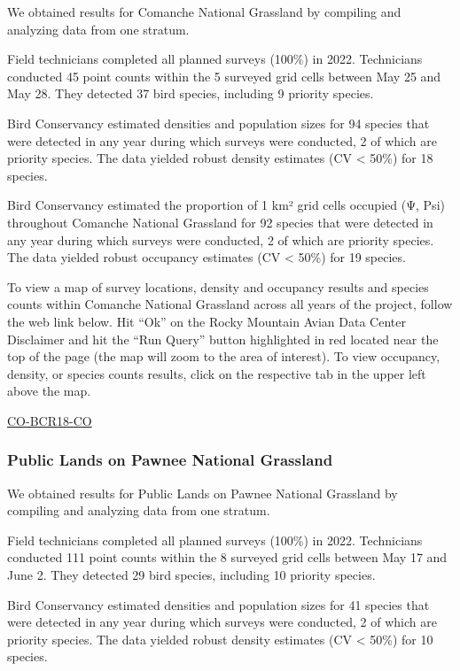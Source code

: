 \documentclass[
  letterpaper,
  DIV=11,
  numbers=noendperiod,
  oneside]{scrreprt}
\begin{document}
We obtained results for Comanche National Grassland by compiling and
analyzing data from one stratum.

Field technicians completed all planned surveys (100\%) in 2022.
Technicians conducted 45 point counts within the 5 surveyed grid cells
between May 25 and May 28. They detected 37 bird species, including 9
priority species.

Bird Conservancy estimated densities and population sizes for 94 species
that were detected in any year during which surveys were conducted, 2 of
which are priority species. The data yielded robust density estimates
(CV \textless{} 50\%) for 18 species.

Bird Conservancy estimated the proportion of 1 km² grid cells occupied
(Ψ, Psi) throughout Comanche National Grassland for 92 species that were
detected in any year during which surveys were conducted, 2 of which are
priority species. The data yielded robust occupancy estimates (CV
\textless{} 50\%) for 19 species.

To view a map of survey locations, density and occupancy results and
species counts within Comanche National Grassland across all years of
the project, follow the web link below. Hit ``Ok'' on the Rocky Mountain
Avian Data Center Disclaimer and hit the ``Run Query'' button
highlighted in red located near the top of the page (the map will zoom
to the area of interest). To view occupancy, density, or species counts
results, click on the respective tab in the upper left above the map.

\href{http://www.rmbo.org/new_site/adc/QueryWindow.aspx\#N4IgzgLgTghhCuBbEAuABCAwgeQLQCFMAlARgA5cd1MB7RGAOwGMALAUzQDk4BLGhmABs0AcVhgwgxgBMQAXyA==}{CO-BCR18-CO}

\hypertarget{public-lands-on-pawnee-national-grassland}{%
\subsubsection{Public Lands on Pawnee National
Grassland}\label{public-lands-on-pawnee-national-grassland}}

We obtained results for Public Lands on Pawnee National Grassland by
compiling and analyzing data from one stratum.

Field technicians completed all planned surveys (100\%) in 2022.
Technicians conducted 111 point counts within the 8 surveyed grid cells
between May 17 and June 2. They detected 29 bird species, including 10
priority species.

Bird Conservancy estimated densities and population sizes for 41 species
that were detected in any year during which surveys were conducted, 2 of
which are priority species. The data yielded robust density estimates
(CV \textless{} 50\%) for 10 species.
\end{document}

